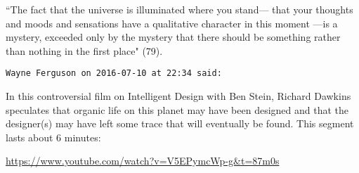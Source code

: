 \begin{footnotesize}
\begin{sffamily}
``The fact that the universe is illuminated where you stand— that your thoughts and moods and sensations have a qualitative character in this moment —is a mystery, exceeded only by the mystery that there should be something rather than nothing in the first place" (79).


\hfill

\texttt{Wayne Ferguson on 2016-07-10 at 22:34 said: }

In this controversial film on Intelligent Design with Ben Stein, Richard Dawkins speculates that organic life on this planet may have been designed and that the designer(s) may have left some trace that will eventually be found. This segment lasts about 6 minutes:

\url{https://www.youtube.com/watch?v=V5EPymcWp-g\&t=87m0s}


\hfill


\end{sffamily}\end{footnotesize}
